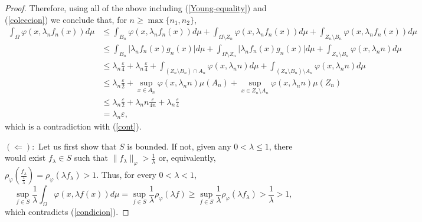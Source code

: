 \documentclass[11pt,a4paper]{amsart}
\begin{document}
\begin{proof}
    Therefore, using all of the above including (\ref{Young-equality}) and (\ref{coleccion}) we conclude that, for $n\geq \max\{n_1,n_2\}$,
    \begin{align*}
        \int_{\Omega} \varphi(x,\lambda_n f_n(x)) d\mu {}    &   \leq\int_{B_n} \varphi(x,\lambda_n f_n(x)) d\mu + \int_{\Omega\setminus Z_n} \varphi(x,\lambda_n f_n(x)) d\mu + \int_{Z_n\setminus B_n} \varphi(x,\lambda_n f_n(x)) d\mu\\
        {}  &   \leq \int_{B_n} \vert \lambda_n f_n(x) g_n(x)\vert d\mu + \int_{\Omega\setminus Z_n} \vert \lambda_n f_n(x) g_n(x)\vert d\mu + \int_{Z_n\setminus B_n} \varphi(x,\lambda_n n) d\mu\\
        {}  &  \leq \lambda_n \frac{\varepsilon}{4} +\lambda_n \frac{\varepsilon}{4} + \int_{(Z_n\setminus B_n)\cap A_n} \varphi(x,\lambda_n n) d\mu + \int_{(Z_n\setminus B_n)\setminus A_n} \varphi(x,\lambda_n n) d\mu\\
        {}  &   \leq \lambda_n \frac{\varepsilon}{2} + \sup_{x\in A_n} \varphi(x,\lambda_n n) \mu(A_n) + \sup_{x\in Z_n\setminus A_n} \varphi(x,\lambda_n n) \mu(Z_n)\\
        {}  &   \leq \lambda_n \frac{\varepsilon}{2} + \lambda_n n \frac{\varepsilon}{4n} + \lambda_n\frac{\varepsilon}{4}\\
        {}  &   =\lambda_n  \varepsilon,
    \end{align*}
    which is a contradiction with (\ref{cont}).

$(\Leftarrow):$
    Let us first show that $S$ is bounded. If not, given any $0<\lambda\leq 1$, there would exist $f_\lambda\in S$ such that $\lVert f_\lambda\rVert_{\varphi} > \frac{1}{\lambda}$ or, equivalently, $\rho_{\varphi}(\frac{f_\lambda}{\frac{1}{\lambda}})=\rho_{\varphi}(\lambda f_\lambda) >1$. Thus, for every $0<\lambda<1$,
    $$
    \sup_{f\in S}\frac{1}{\lambda}\int_{\Omega} \varphi(x,\lambda f(x)) d\mu
    =\sup_{f\in S}\frac{1}{\lambda}\rho_{\varphi}(\lambda f)
    \geq\sup_{f\in S}\frac{1}{\lambda}\rho_{\varphi}(\lambda f_\lambda)
    > \frac{1}{\lambda}>1,
    $$
    which contradicts (\ref{condicion}).


\end{proof}
\end{document}
